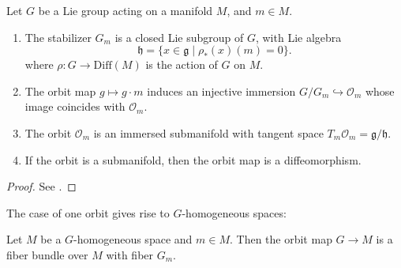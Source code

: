 \documentclass{report}
\begin{document}
\begin{theorem}
    Let $G$ be a Lie group acting on a manifold $M$, and $m \in M$.
    \begin{enumerate}[label = (\roman*)]
        \item The stabilizer $G_m$ is a closed Lie subgroup of $G$, with Lie algebra
        \[
        \mathfrak h = \{ x \in \mathfrak g \mid \rho_*(x)(m) = 0 \}.
        \]
        where $\rho: G \to \mathrm{Diff}(M)$ is the action of $G$ on $M$.
        \item The orbit map $g \mapsto g \cdot m$ induces an injective immersion $G/G_m \hookrightarrow \mathcal O_m$ whose image coincides with $\mathcal O_m$.
        \item The orbit $\mathcal O_m$ is an immersed submanifold with tangent space $T_m \mathcal O_m = \mathfrak g / \mathfrak h $.
        \item If the orbit is a submanifold, then the orbit map is a diffeomorphism.
    \end{enumerate}
\end{theorem}
\begin{proof}
See \cite[Theorem 2.20, Theorem 3.29]{kirillov2008introduction}.
\end{proof}

The case of one orbit gives rise to $G$-homogeneous spaces:
\begin{theorem}
    Let $M$ be a $G$-homogeneous space and $m \in M$.
    Then the orbit map $G \to M$ is a fiber bundle over $M$ with fiber $G_m$.
\end{theorem}
\end{document}
